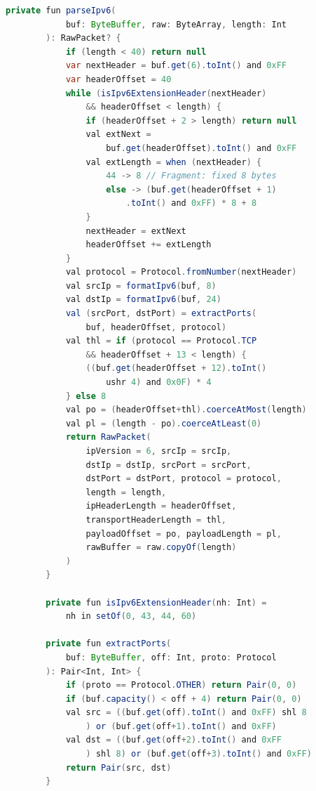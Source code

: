 \begin{lstlisting}[language=Java, caption={RawPacket.kt --- Complete packet parser}, label={lst:rawpacket}]
        private fun parseIpv6(
            buf: ByteBuffer, raw: ByteArray, length: Int
        ): RawPacket? {
            if (length < 40) return null
            var nextHeader = buf.get(6).toInt() and 0xFF
            var headerOffset = 40
            while (isIpv6ExtensionHeader(nextHeader)
                && headerOffset < length) {
                if (headerOffset + 2 > length) return null
                val extNext =
                    buf.get(headerOffset).toInt() and 0xFF
                val extLength = when (nextHeader) {
                    44 -> 8 // Fragment: fixed 8 bytes
                    else -> (buf.get(headerOffset + 1)
                        .toInt() and 0xFF) * 8 + 8
                }
                nextHeader = extNext
                headerOffset += extLength
            }
            val protocol = Protocol.fromNumber(nextHeader)
            val srcIp = formatIpv6(buf, 8)
            val dstIp = formatIpv6(buf, 24)
            val (srcPort, dstPort) = extractPorts(
                buf, headerOffset, protocol)
            val thl = if (protocol == Protocol.TCP
                && headerOffset + 13 < length) {
                ((buf.get(headerOffset + 12).toInt()
                    ushr 4) and 0x0F) * 4
            } else 8
            val po = (headerOffset+thl).coerceAtMost(length)
            val pl = (length - po).coerceAtLeast(0)
            return RawPacket(
                ipVersion = 6, srcIp = srcIp,
                dstIp = dstIp, srcPort = srcPort,
                dstPort = dstPort, protocol = protocol,
                length = length,
                ipHeaderLength = headerOffset,
                transportHeaderLength = thl,
                payloadOffset = po, payloadLength = pl,
                rawBuffer = raw.copyOf(length)
            )
        }

        private fun isIpv6ExtensionHeader(nh: Int) =
            nh in setOf(0, 43, 44, 60)

        private fun extractPorts(
            buf: ByteBuffer, off: Int, proto: Protocol
        ): Pair<Int, Int> {
            if (proto == Protocol.OTHER) return Pair(0, 0)
            if (buf.capacity() < off + 4) return Pair(0, 0)
            val src = ((buf.get(off).toInt() and 0xFF) shl 8
                ) or (buf.get(off+1).toInt() and 0xFF)
            val dst = ((buf.get(off+2).toInt() and 0xFF
                ) shl 8) or (buf.get(off+3).toInt() and 0xFF)
            return Pair(src, dst)
        }


\end{lstlisting}
